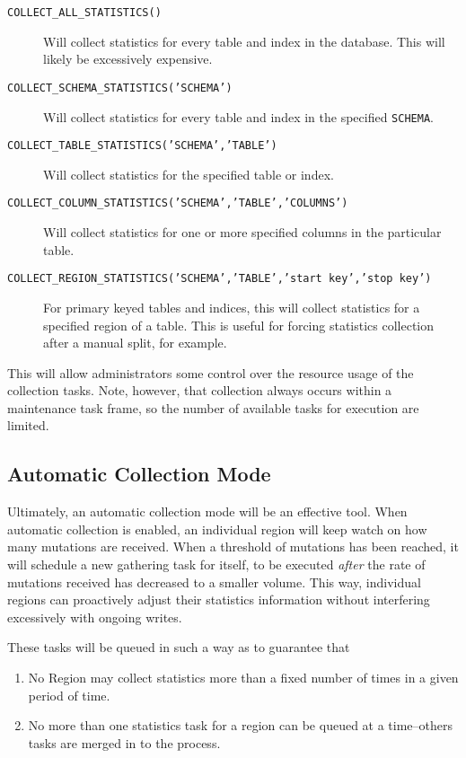 \begin{description}
				\item[\texttt{COLLECT\_ALL\_STATISTICS()}] Will collect statistics for every table and index in the database. This will likely be excessively expensive.
				\item[\texttt{COLLECT\_SCHEMA\_STATISTICS('SCHEMA')}] Will collect statistics for every table and index in the specified \texttt{SCHEMA}. 
				\item[\texttt{COLLECT\_TABLE\_STATISTICS('SCHEMA','TABLE')}] Will collect statistics for the specified table or index.
				\item[\texttt{COLLECT\_COLUMN\_STATISTICS('SCHEMA','TABLE','COLUMNS')}] Will collect statistics for one or more specified columns in the particular table.
								\item[\texttt{COLLECT\_REGION\_STATISTICS('SCHEMA','TABLE','start key','stop key')}] For primary keyed tables and indices, this will collect statistics for a specified region of a table. This is useful for forcing statistics collection after a manual split, for example.
\end{description}
This will allow administrators some control over the resource usage of the collection tasks. Note, however, that collection always occurs within a maintenance task frame, so the number of available tasks for execution are limited.

\subsection{Automatic Collection Mode}
Ultimately, an automatic collection mode will be an effective tool. When automatic collection is enabled, an individual region will keep watch on how many mutations are received. When a threshold of mutations has been reached, it will schedule a new gathering task for itself, to be executed \emph{after} the rate of mutations received has decreased to a smaller volume. This way, individual regions can proactively adjust their statistics information without interfering excessively with ongoing writes. 

These tasks will be queued in such a way as to guarantee that

\begin{enumerate}
				\item No Region may collect statistics more than a fixed number of times in a given period of time.
				\item No more than one statistics task for a region can be queued at a time--others tasks are merged in to the process.
\end{enumerate}

